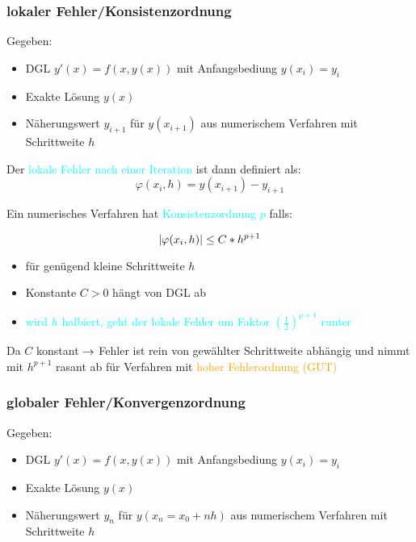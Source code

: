 \subsubsection{lokaler Fehler/Konsistenzordnung}

Gegeben:
\begin{itemize}
	\item DGL $y'(x) = f(x, y(x))$ mit Anfangsbediung $y(x_i) = y_i$
	\item Exakte Lösung $y(x)$
	\item Näherungswert $y_{i+1}$ für $y(x_{i+1})$ aus numerischem
	      Verfahren mit Schrittweite $h$
\end{itemize}


Der \textcolor{cyan}{lokale Fehler nach einer Iteration} ist dann definiert als:
$$\varphi(x_i, h) = y(x_{i+1}) - y_{i+1}$$

\begingroup
Ein numerisches Verfahren hat \textcolor{cyan}{Konsistenzordnung $p$} falls:
\large
\begin{multicols}{2}
	$$|\varphi(x_i, h)| \le C * h^{p+1}
		\vspace{\fill}
	$$
	\columnbreak
	\begin{itemize}
		\item für genügend kleine Schrittweite $h$
		\item Konstante $C > 0$ hängt von DGL ab
		\item \textcolor{cyan}{wird $h$ halbiert, geht der lokale Fehler
			      um Faktor $(\frac{1}{2})^{p+1}$ runter}
	\end{itemize}
\end{multicols}
\endgroup

Da $C$ konstant $\rightarrow$ Fehler ist rein von gewählter Schrittweite abhängig
und nimmt mit $h^{p+1}$ rasant ab für Verfahren mit
\textcolor{orange}{hoher Fehlerordnung (GUT)}


\subsubsection{globaler Fehler/Konvergenzordnung}


Gegeben:
\begin{itemize}
	\item DGL $y'(x) = f(x, y(x))$ mit Anfangsbediung $y(x_i) = y_i$
	\item Exakte Lösung $y(x)$
	\item Näherungswert $y_n$ für $y(x_n=x_0 + n h)$ aus numerischem
	      Verfahren mit Schrittweite $h$
\end{itemize}

